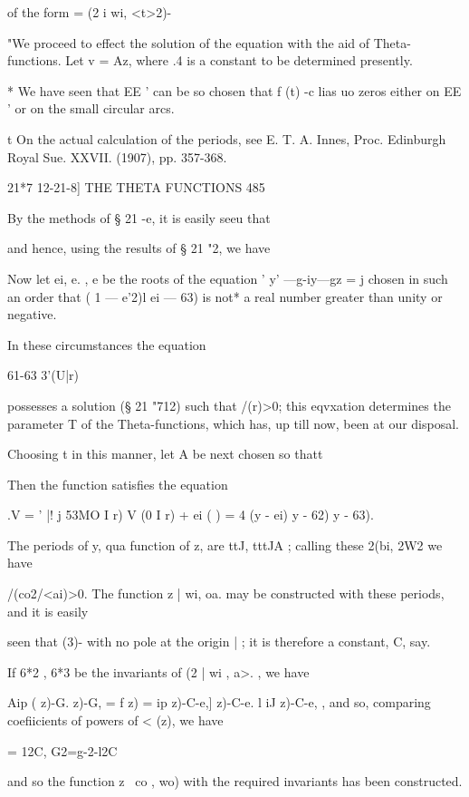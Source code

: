 of the form = (2 i wi, <t>2)-

"We proceed to effect the solution of the equation with the aid of
Theta-functions. Let v = Az, where .4 is a constant to be determined
presently.

* We have seen that EE ' can be so chosen that f (t) -c lias uo zeros
either on EE ' or on the small circular arcs.

t On the actual calculation of the periods, see E. T. A. Innes, Proc.
Edinburgh Royal Sue. XXVII. (1907), pp. 357-368.

21*7 12-21-8] THE THETA FUNCTIONS 485

By the methods of § 21 -e, it is easily seeu that

and hence, using the results of § 21 "2, we have

Now let ei, e. , e be the roots of the equation ' y' —g-iy—gz = j
chosen in such an order that ( 1 — e'2)l ei — 63) is not* a real
number greater than unity or negative.

In these circumstances the equation

61-63 3'(U|r)

possesses a solution (§ 21 "712) such that /(r)>0; this eqvxation
determines the parameter T of the Theta-functions, which has, up till
now, been at our disposal.

Choosing t in this manner, let A be next chosen so thatt

Then the function satisfies the equation

.V = ' |! j 53MO I r) V (0 I r) + ei ( ) = 4 (y - ei) y - 62) y - 63).

The periods of y, qua function of z, are ttJ, tttJA ; calling these
2(bi, 2W2 we have

/(co2/<ai)>0. The function z | wi, oa. may be constructed with these
periods, and it is easily

seen that (3)- %
with no pole at the origin | ; it is therefore a constant, C, say.

If 6*2 , 6*3 be the invariants of (2 | wi , a>. , we have

Aip ( z)-G. z)-G, = f z) = ip z)-C-e,] z)-C-e. l iJ z)-C-e, , and so,
comparing coefiicients of powers of < (z), we have

= 12C, G2=g-2-l2C%

and so the function z \ co , wo) with the required invariants has been
constructed.

